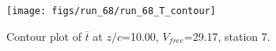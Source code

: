 \begin{figure}[H]
\centering
\texttt{[image: figs/run\_68/run\_68\_T\_contour]}
\caption{Contour plot of $\overline{t}$ at $z/c$=10.00, $V_{free}$=29.17, station 7.}
\label{fig:run_68_T_contour}
\end{figure}


